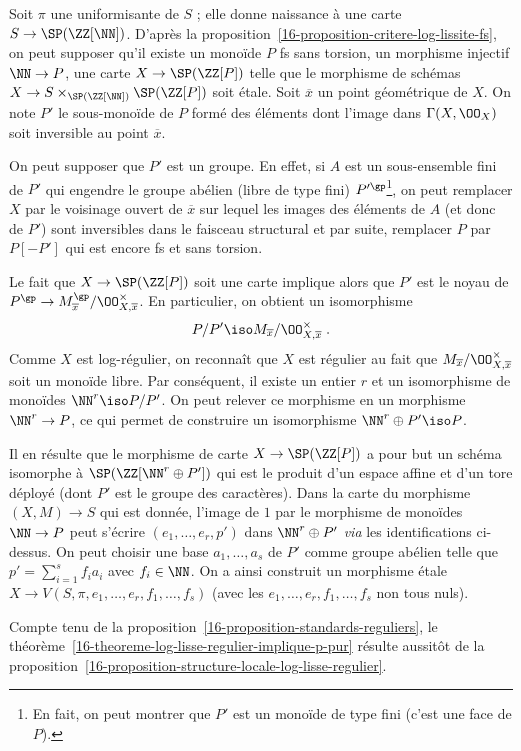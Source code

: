 \documentclass[10pt]{../fichiers-configuration-latex/smfart}
\begin{document}
Soit $\pi$ une uniformisante de $S$ ; elle donne naissance
à une carte $S\to \SP(\ZZ[\NN])$.
D'après la
proposition~\ref{16-proposition-critere-log-lissite-fs}, on peut supposer qu'il
existe un monoïde $P$ fs sans torsion, un morphisme injectif $\NN\to P$, une
carte $X\to\SP(\ZZ[P])$ telle que le morphisme de schémas 
$X\to S\times_{\SP(\ZZ[\NN])}\SP(\ZZ[P])$ soit étale. Soit $\overline x$ un
point géométrique de $X$. On note $P'$ le sous-monoïde de $P$ formé des
éléments dont l'image dans $\Gamma(X,\OO_X)$ soit inversible au point
$\overline x$.

On peut supposer que $P'$ est un groupe. En effet, si $A$
est un sous-ensemble fini de $P'$ qui engendre le
groupe abélien (libre de type fini) $P'^{\gp}$\;\footnote{En fait,
on peut montrer que $P'$ est un monoïde de type fini
(c'est une face de $P$).},
on peut remplacer $X$ par
le voisinage ouvert de $\overline x$ sur lequel les images des éléments de
$A$ (et donc de $P'$) sont inversibles dans le faisceau structural et par
suite, remplacer $P$ par $P[-P']$ qui est encore fs et sans torsion.

Le fait que $X\to \SP(\ZZ[P])$ soit une carte implique alors que $P'$
est le noyau de
$P^{\gp}\to M_{\overline x}^{\gp}/\OO^\times_{X,\overline x}$. En
particulier, on obtient un isomorphisme
\[P/P'\iso M_{\overline
x}/\OO^\times_{X,\overline x}\;\text{.}\]
Comme $X$ est log-régulier, on reconnaît que $X$ est régulier au fait que
$M_{\overline x}/\OO^\times_{X,\overline x}$ soit un monoïde libre. Par
conséquent, il existe un entier $r$ et un isomorphisme de monoïdes
$\NN^r\iso P/P'$. On peut relever ce morphisme en un morphisme $\NN^r\to
P$, ce qui permet de construire un isomorphisme $\NN^r\oplus P'\iso
P$.

Il en résulte que le morphisme de carte $X\to \SP(\ZZ[P])$ a pour but un
schéma isomorphe à
$\SP(\ZZ[\NN^r\oplus P'])$ qui est le produit d'un espace affine
et d'un tore déployé (dont $P'$ est le groupe des caractères). Dans la
carte du morphisme $(X,M)\to S$ qui est donnée, l'image de $1$ par le
morphisme de monoïdes $\NN\to P$ peut s'écrire $(e_1,\dots,e_r,p')$ dans
$\NN^r\oplus P'$ \emph{via} les identifications ci-dessus. On peut choisir
une base $a_1,\dots,a_s$ de $P'$ comme groupe abélien telle que
$p'=\sum_{i=1}^s f_i a_i$ avec $f_i\in\NN$. On a ainsi construit un
morphisme étale $X\to V(S,\pi,e_1,\dots,e_r,f_1,\dots,f_s)$ (avec les
$e_1,\dots,e_r,f_1,\dots,f_s$ non tous nuls).

\medskip

Compte tenu de la proposition~\ref{16-proposition-standards-reguliers},
le théorème~\ref{16-theoreme-log-lisse-regulier-implique-p-pur} résulte
aussitôt de la
proposition~\ref{16-proposition-structure-locale-log-lisse-regulier}.
\end{document}
